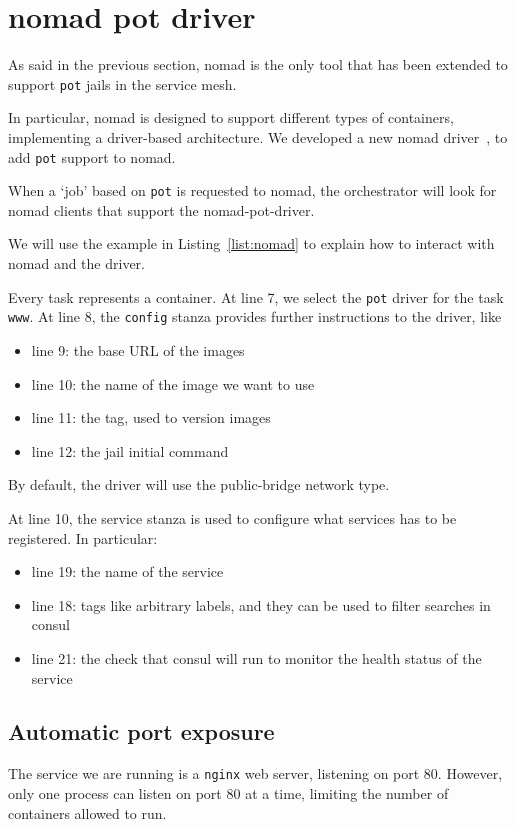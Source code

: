 \documentclass[conference,a4paper,11pt]{IEEEtran}
\begin{document}
\section{nomad pot driver}\label{sec:nomad-pot-driver}
As said in the previous section, nomad is the only tool that has been extended to support \texttt{pot} jails in the service mesh.

In particular, nomad is designed to support different types of containers, implementing a driver-based architecture. We developed a new nomad driver~\cite{nomad-pot-driver}, to add \texttt{pot} support to nomad.

When a ‘job’ based on \texttt{pot} is requested to nomad, the orchestrator will look for nomad clients that support the nomad-pot-driver.

We will use the example in Listing~\ref{list:nomad} to explain how to interact with nomad and the driver.

Every task represents a container. At line 7, we select the \texttt{pot} driver for the task \texttt{www}. At line 8, the \texttt{config} stanza provides further instructions to the driver, like
\begin{itemize}
	\item line 9: the base URL of the images
	\item line 10: the name of the image we want to use
	\item line 11: the tag, used to version images
	\item line 12: the jail initial command
\end{itemize}
By default, the driver will use the public-bridge network type.

At line 10, the service stanza is used to configure what services has to be registered. In particular:
\begin{itemize}
	\item line 19: the name of the service
	\item line 18: tags like arbitrary labels, and they can be used to filter searches in consul
	\item line 21: the check that consul will run to monitor the health status of the service
\end{itemize}

\subsection{Automatic port exposure}
The service we are running is a \texttt{nginx} web server, listening on port 80. However, only one process can listen on port 80 at a time, limiting the number of containers allowed to run.
\end{document}
